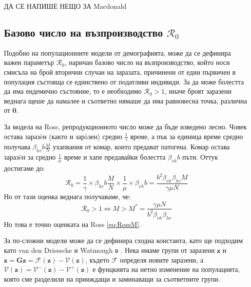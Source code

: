 \color{Red} ДА СЕ НАПИШЕ НЕЩО ЗА Macdonald
\color{Black}

\subsection{Базово число на възпроизводство $\mathscr{R}_0$}
Подобно на популационните модели от демографията, може да се дефинира важен параметър $\mathscr{R}_0$, наричан базово число на възпроизводство, който носи смисъла на брой вторични случаи на заразата, причинени от един първичен в популация състояща се единствено от податливи индивиди.
За да може болестта да има ендемично състояние, то е необходимо $\mathscr{R}_0 > 1$, иначе броят заразени веднага щеше да намалее и съответно нямаше да има равновесна точка, различна от $\mathbf{0}$.

За модела на Ross, репродукционното число може да бъде изведено лесно.
Човек остава заразèн (както и зарàзен) средно $\frac{1}{\gamma}$ време, а пък за единица време средно получава $\beta_{hv} b \frac{M}{N}$ ухапвания от комар, които предават патогена.
Комар остава заразèн за средно $\frac{1}{\mu}$ време и хапе предавайки болестта $\beta_{vh} b$ пъти.
Оттук достигаме до:
\begin{equation}
  \mathscr{R}_0 = \frac{1}{\gamma} \times \beta_{hv} b \frac{M}{N} \times \frac{1}{\mu} \times \beta_{vh} b = \frac{b^2 \beta_{vh} \beta_{hv} M}{\gamma \mu N}
\end{equation}
Но от тази оценка веднага получаваме, че:
\begin{equation}
  \mathscr{R}_0 > 1 \iff M > M^* = \frac{\gamma \mu N}{b^2 \beta_{vh} \beta_{hv}}
\end{equation}
Но това е точно оценката на Ross \eqref{eq:RossM}.

За по-сложни модели може да се дефинира сходна константа, като ще подходим като van den Driessche и Watmough в \cite{Driessche2002}. Нека имаме групи от заразени $\mathbf{z}$ и $\dot{\mathbf{z}} = \mathbf{G}{\mathbf{z}} = \mathscr{F}(\mathbf{z}) - \mathscr{V}(\mathbf{z})$, където $\mathscr{F}$ определя новите заразени, а $\mathscr{V}(\mathbf{z}) = \mathscr{V}^-(\mathbf{z}) - \mathscr{V}^+(\mathbf{z})$ е фунцкията на нетно изменение на популацията, която сме разделили на прииждащи и заминаващи за съответните групи.

